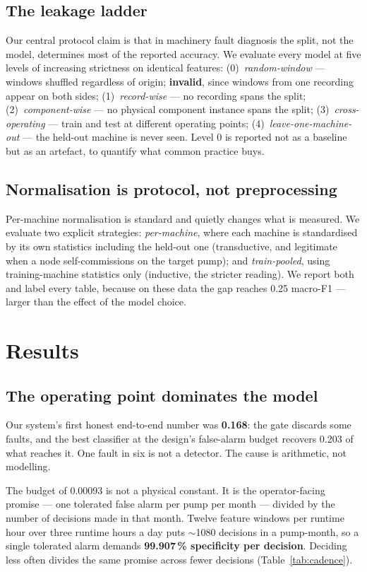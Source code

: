 \documentclass[conference,a4paper,10pt]{IEEEtran}
\begin{document}
\subsection{The leakage ladder}
Our central protocol claim is that in machinery fault diagnosis the split, not the
model, determines most of the reported accuracy. We evaluate every model at five
levels of increasing strictness on identical features:
(0)~\emph{random-window} --- windows shuffled regardless of origin; \textbf{invalid},
since windows from one recording appear on both sides;
(1)~\emph{record-wise} --- no recording spans the split;
(2)~\emph{component-wise} --- no physical component instance spans the split;
(3)~\emph{cross-operating} --- train and test at different operating points;
(4)~\emph{leave-one-machine-out} --- the held-out machine is never seen.
Level 0 is reported not as a baseline but as an artefact, to quantify what common
practice buys.

\subsection{Normalisation is protocol, not preprocessing}
Per-machine normalisation is standard and quietly changes what is measured. We
evaluate two explicit strategies: \emph{per-machine}, where each machine is
standardised by its own statistics including the held-out one (transductive, and
legitimate when a node self-commissions on the target pump); and
\emph{train-pooled}, using training-machine statistics only (inductive, the
stricter reading). We report both and label every table, because on these data
the gap reaches 0.25 macro-F1 --- larger than the effect of the model choice.

\section{Results}
\subsection{The operating point dominates the model}
\label{sec:op}
Our system's first honest end-to-end number was \textbf{0.168}: the gate discards
some faults, and the best classifier at the design's false-alarm budget recovers
0.203 of what reaches it. One fault in six is not a detector. The cause is
arithmetic, not modelling.

The budget of 0.00093 is not a physical constant. It is the operator-facing promise
--- one tolerated false alarm per pump per month --- divided by the number of
decisions made in that month. Twelve feature windows per runtime hour over three
runtime hours a day puts $\sim$1080 decisions in a pump-month, so a single tolerated
alarm demands \textbf{99.907\,\% specificity per decision}. Deciding less often
divides the same promise across fewer decisions (Table~\ref{tab:cadence}).
\end{document}
